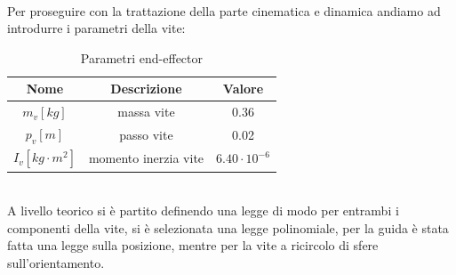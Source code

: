 \\Per proseguire con la trattazione della parte cinematica e dinamica andiamo ad introdurre i parametri della vite:
\begin{table}[h!]
\centering
\begin{tabular}{|c |c |c|} 
 \hline
 Nome & Descrizione  & Valore \\ [0.5ex] 
 \hline\hline
 $m_v [kg]$ & massa vite  & 0.36 \\ 
 $p_v [m]$ & passo vite & 0.02 \\
 $I_v [kg\cdot m^2]$ & momento inerzia vite  & $6.40\cdot 10^{-6}$ \\
 \hline
\end{tabular}
\caption{Parametri end-effector}
\label{table:2}
\end{table}
\\A livello teorico si è partito definendo una legge di modo per entrambi i componenti della vite, si è selezionata una legge polinomiale, per la guida è stata fatta una legge sulla posizione, mentre per la vite a ricircolo di sfere sull'orientamento.
